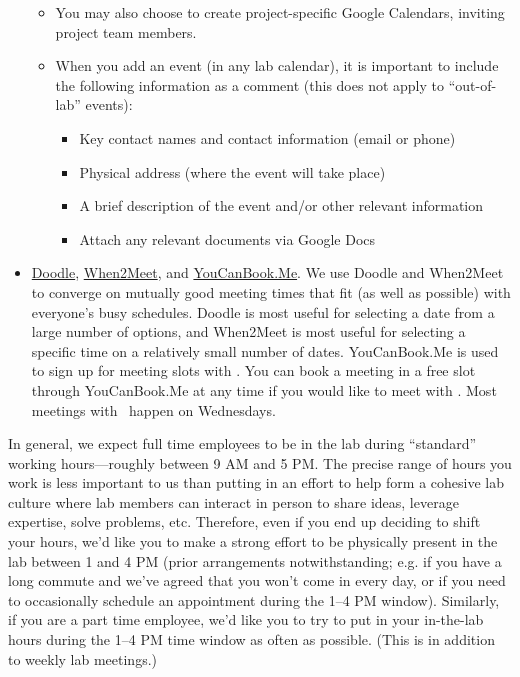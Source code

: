 \documentclass{tufte-book} %
\begin{document}
\begin{itemize}
\begin{itemize}
  \item You may also choose to create project-specific
    Google Calendars, inviting project team members.
  \item When you add an event (in any lab calendar), it is important
    to include the following information as a comment (this does not
    apply to ``out-of-lab'' events):
\begin{itemize}
  \item Key contact names and contact information (email or phone)
  \item Physical address (where the event will take place)
  \item A brief description of the event and/or other relevant information
  \item Attach any relevant documents via Google Docs
  \end{itemize}
  \end{itemize}
\item \href{http://www.doodle.com}{Doodle},
  \href{http://www.when2meet.com}{When2Meet}, and
  \href{https://context-lab.youcanbook.me/}{YouCanBook.Me}.  We use
  Doodle and When2Meet to converge on mutually good meeting times that
  fit (as well as possible) with everyone's busy schedules.  Doodle is
  most useful for selecting a date from a large number of options, and
  When2Meet is most useful for selecting a specific time on a
  relatively small number of dates.  YouCanBook.Me is used to sign up
  for meeting slots with \director.  You can book a meeting in a free
  slot through YouCanBook.Me at any time if you would like to meet
  with \director.  Most meetings with \director~happen on Wednesdays.
\end{itemize}


\noindent In general, we expect full time employees to be in the lab during
 ``standard'' working hours---roughly between 9 AM and 5 PM.  The
 precise range of hours you work is less important to us than putting
 in an effort to help form a cohesive lab culture where lab members
 can interact in person to share ideas, leverage expertise, solve
 problems, etc.  Therefore, even if you end up deciding to shift your
 hours, we'd like you to make a strong effort to be physically present
 in the lab between 1 and 4 PM (prior arrangements notwithstanding;
 e.g. if you have a long commute and we've agreed that you won't come
 in every day, or if you need to occasionally schedule an
 appointment during the 1--4 PM window).  Similarly, if
 you are a part time employee, we'd like you to try to put in your
 in-the-lab hours during the 1--4 PM time window as often as
 possible.  (This is in addition to weekly lab meetings.)
\end{document}
